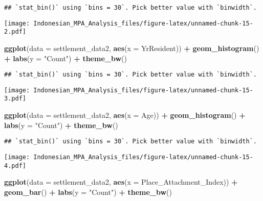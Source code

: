 \documentclass[
]{article}
\newenvironment{Shaded}{\begin{snugshade}}{\end{snugshade}}
\newcommand{\AttributeTok}[1]{\textcolor[rgb]{0.13,0.29,0.53}{#1}}
\newcommand{\FunctionTok}[1]{\textcolor[rgb]{0.13,0.29,0.53}{\textbf{#1}}}
\newcommand{\NormalTok}[1]{#1}
\newcommand{\SpecialCharTok}[1]{\textcolor[rgb]{0.81,0.36,0.00}{\textbf{#1}}}
\newcommand{\StringTok}[1]{\textcolor[rgb]{0.31,0.60,0.02}{#1}}
\begin{document}
\begin{verbatim}
## `stat_bin()` using `bins = 30`. Pick better value with `binwidth`.
\end{verbatim}

\texttt{[image: Indonesian\_MPA\_Analysis\_files/figure-latex/unnamed-chunk-15-2.pdf]}

\begin{Shaded}
\begin{Highlighting}[]
\FunctionTok{ggplot}\NormalTok{(}\AttributeTok{data =}\NormalTok{ settlement\_data2, }\FunctionTok{aes}\NormalTok{(}\AttributeTok{x =}\NormalTok{ YrResident)) }\SpecialCharTok{+}
  \FunctionTok{geom\_histogram}\NormalTok{() }\SpecialCharTok{+}
  \FunctionTok{labs}\NormalTok{(}\AttributeTok{y =} \StringTok{"Count"}\NormalTok{) }\SpecialCharTok{+}
  \FunctionTok{theme\_bw}\NormalTok{()}
\end{Highlighting}
\end{Shaded}

\begin{verbatim}
## `stat_bin()` using `bins = 30`. Pick better value with `binwidth`.
\end{verbatim}

\texttt{[image: Indonesian\_MPA\_Analysis\_files/figure-latex/unnamed-chunk-15-3.pdf]}

\begin{Shaded}
\begin{Highlighting}[]
\FunctionTok{ggplot}\NormalTok{(}\AttributeTok{data =}\NormalTok{ settlement\_data2, }\FunctionTok{aes}\NormalTok{(}\AttributeTok{x =}\NormalTok{ Age)) }\SpecialCharTok{+}
  \FunctionTok{geom\_histogram}\NormalTok{() }\SpecialCharTok{+}
  \FunctionTok{labs}\NormalTok{(}\AttributeTok{y =} \StringTok{"Count"}\NormalTok{) }\SpecialCharTok{+}
  \FunctionTok{theme\_bw}\NormalTok{()}
\end{Highlighting}
\end{Shaded}

\begin{verbatim}
## `stat_bin()` using `bins = 30`. Pick better value with `binwidth`.
\end{verbatim}

\texttt{[image: Indonesian\_MPA\_Analysis\_files/figure-latex/unnamed-chunk-15-4.pdf]}

\begin{Shaded}
\begin{Highlighting}[]
\FunctionTok{ggplot}\NormalTok{(}\AttributeTok{data =}\NormalTok{ settlement\_data2, }\FunctionTok{aes}\NormalTok{(}\AttributeTok{x =}\NormalTok{ Place\_Attachment\_Index)) }\SpecialCharTok{+}
  \FunctionTok{geom\_bar}\NormalTok{() }\SpecialCharTok{+}
  \FunctionTok{labs}\NormalTok{(}\AttributeTok{y =} \StringTok{"Count"}\NormalTok{) }\SpecialCharTok{+}
  \FunctionTok{theme\_bw}\NormalTok{()}
\end{Highlighting}
\end{Shaded}
\end{document}
